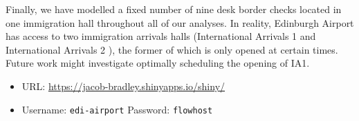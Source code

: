 \documentclass[10pt]{article}
\begin{document}
Finally, we have modelled a fixed number of nine desk border checks located in one immigration hall throughout all of our analyses. In reality, Edinburgh Airport has access to two immigration arrivals halls (International Arrivals 1 and International Arrivals 2 \cite{international_arrivals}), the former of which is only opened at certain times. Future work might investigate optimally scheduling the opening of IA1. 



\begin{tcolorbox}[
colframe=edi-dark-purple,
colback=edi-light-purple,
fonttitle=\bfseries,
title = {Use our Shiny Application to interactively explore demand scenarios!}]
\begin{itemize}
\item URL: \url{https://jacob-bradley.shinyapps.io/shiny/}
\item Username: \texttt{edi-airport} \quad Password: \texttt{flowhost}
\end{itemize}
\end{tcolorbox}

{\footnotesize
}
% 
\end{document}
